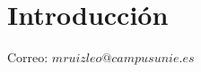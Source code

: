 \documentclass{../Geometria.tex}
\begin{document}
\section{Introducción}
Correo: $mruizleo@campusunie.es$\\
\end{document}
